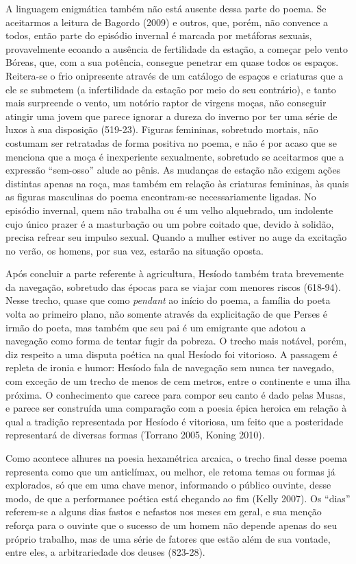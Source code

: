 A linguagem enigmática também não está ausente dessa parte do poema. Se
aceitarmos a leitura de Bagordo (2009) e outros, que, porém, não
convence a todos, então parte do episódio invernal é marcada por
metáforas sexuais, provavelmente ecoando a ausência de fertilidade da
estação, a começar pelo vento Bóreas, que, com a sua potência, consegue
penetrar em quase todos os espaços. Reitera-se o frio onipresente
através de um catálogo de espaços e criaturas que a ele se submetem (a
infertilidade da estação por meio do seu contrário), e tanto mais
surpreende o vento, um notório raptor de virgens moças, não conseguir
atingir uma jovem que parece ignorar a dureza do inverno por ter uma
série de luxos à sua disposição (519-23). Figuras femininas, sobretudo
mortais, não costumam ser retratadas de forma positiva no poema, e não é
por acaso que se menciona que a moça é inexperiente sexualmente,
sobretudo se aceitarmos que a expressão ``sem-osso'' alude ao pênis. As
mudanças de estação não exigem ações distintas apenas na roça, mas
também em relação às criaturas femininas, às quais as figuras masculinas
do poema encontram-se necessariamente ligadas. No episódio invernal,
quem não trabalha ou é um velho alquebrado, um indolente cujo único
prazer é a masturbação ou um pobre coitado que, devido à solidão,
precisa refrear seu impulso sexual. Quando a mulher estiver no auge da
excitação no verão, os homens, por sua vez, estarão na situação oposta.

Após concluir a parte referente à agricultura, Hesíodo também trata
brevemente da navegação, sobretudo das épocas para se viajar com menores
riscos (618-94). Nesse trecho, quase que como \emph{pendant} ao início
do poema, a família do poeta volta ao primeiro plano, não somente
através da explicitação de que Perses é irmão do poeta, mas também que
seu pai é um emigrante que adotou a navegação como forma de tentar fugir
da pobreza. O trecho mais notável, porém, diz respeito a uma disputa
poética na qual Hesíodo foi vitorioso. A passagem é repleta de ironia e
humor: Hesíodo fala de navegação sem nunca ter navegado, com exceção de
um trecho de menos de cem metros, entre o continente e uma ilha próxima.
O conhecimento que carece para compor seu canto é dado pelas Musas, e
parece ser construída uma comparação com a poesia épica heroica em
relação à qual a tradição representada por Hesíodo é vitoriosa, um feito
que a posteridade representará de diversas formas (Torrano 2005, Koning
2010).

Como acontece alhures na poesia hexamétrica arcaica, o trecho final
desse poema representa como que um anticlímax, ou melhor, ele retoma
temas ou formas já explorados, só que em uma chave menor, informando o
público ouvinte, desse modo, de que a performance poética está chegando
ao fim (Kelly 2007). Os ``dias'' referem-se a alguns dias fastos e
nefastos nos meses em geral, e sua menção reforça para o ouvinte que o
sucesso de um homem não depende apenas do seu próprio trabalho, mas de
uma série de fatores que estão além de sua vontade, entre eles, a
arbitrariedade dos deuses (823-28).

